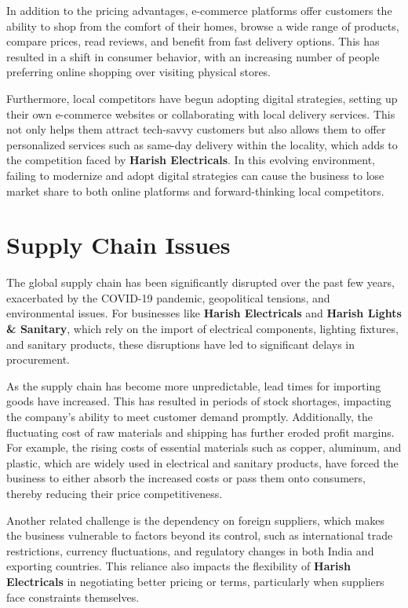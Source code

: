 \documentclass[a4paper,12pt]{report}
\begin{document}
In addition to the pricing advantages, e-commerce platforms offer customers the ability to shop from the comfort of their homes, browse a wide range of products, compare prices, read reviews, and benefit from fast delivery options. This has resulted in a shift in consumer behavior, with an increasing number of people preferring online shopping over visiting physical stores.

Furthermore, local competitors have begun adopting digital strategies, setting up their own e-commerce websites or collaborating with local delivery services. This not only helps them attract tech-savvy customers but also allows them to offer personalized services such as same-day delivery within the locality, which adds to the competition faced by \textbf{Harish Electricals}. In this evolving environment, failing to modernize and adopt digital strategies can cause the business to lose market share to both online platforms and forward-thinking local competitors.

\section{Supply Chain Issues}
The global supply chain has been significantly disrupted over the past few years, exacerbated by the COVID-19 pandemic, geopolitical tensions, and environmental issues. For businesses like \textbf{Harish Electricals} and \textbf{Harish Lights \& Sanitary}, which rely on the import of electrical components, lighting fixtures, and sanitary products, these disruptions have led to significant delays in procurement.

As the supply chain has become more unpredictable, lead times for importing goods have increased. This has resulted in periods of stock shortages, impacting the company’s ability to meet customer demand promptly. Additionally, the fluctuating cost of raw materials and shipping has further eroded profit margins. For example, the rising costs of essential materials such as copper, aluminum, and plastic, which are widely used in electrical and sanitary products, have forced the business to either absorb the increased costs or pass them onto consumers, thereby reducing their price competitiveness.

Another related challenge is the dependency on foreign suppliers, which makes the business vulnerable to factors beyond its control, such as international trade restrictions, currency fluctuations, and regulatory changes in both India and exporting countries. This reliance also impacts the flexibility of \textbf{Harish Electricals} in negotiating better pricing or terms, particularly when suppliers face constraints themselves.
\end{document}
